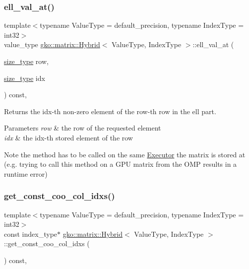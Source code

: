 \subsubsection{\texorpdfstring{ell\+\_\+val\+\_\+at()}{ell\_val\_at()}\hspace{0.1cm}{\footnotesize\ttfamily [2/2]}}
{\footnotesize\ttfamily template$<$typename Value\+Type = default\+\_\+precision, typename Index\+Type = int32$>$ \\
value\+\_\+type \hyperlink{classgko_1_1matrix_1_1Hybrid}{gko\+::matrix\+::\+Hybrid}$<$ Value\+Type, Index\+Type $>$\+::ell\+\_\+val\+\_\+at (\begin{DoxyParamCaption}\item[{\hyperlink{namespacegko_a6e5c95df0ae4e47aab2f604a22d98ee7}{size\+\_\+type}}]{row,  }\item[{\hyperlink{namespacegko_a6e5c95df0ae4e47aab2f604a22d98ee7}{size\+\_\+type}}]{idx }\end{DoxyParamCaption}) const\hspace{0.3cm}{\ttfamily [inline]}, {\ttfamily [noexcept]}}



Returns the {\ttfamily idx}-\/th non-\/zero element of the {\ttfamily row}-\/th row in the ell part. 


\begin{DoxyParams}{Parameters}
{\em row} & the row of the requested element \\
\hline
{\em idx} & the idx-\/th stored element of the row\\
\hline
\end{DoxyParams}
\begin{DoxyNote}{Note}
the method has to be called on the same \hyperlink{classgko_1_1Executor}{Executor} the matrix is stored at (e.\+g. trying to call this method on a G\+PU matrix from the O\+MP results in a runtime error) 
\end{DoxyNote}
\mbox{\label{classgko_1_1matrix_1_1Hybrid_ab637e1576b6449407ee2b57ac203e0f7}} 
\subsubsection{\texorpdfstring{get\+\_\+const\+\_\+coo\+\_\+col\+\_\+idxs()}{get\_const\_coo\_col\_idxs()}}
{\footnotesize\ttfamily template$<$typename Value\+Type = default\+\_\+precision, typename Index\+Type = int32$>$ \\
const index\+\_\+type$\ast$ \hyperlink{classgko_1_1matrix_1_1Hybrid}{gko\+::matrix\+::\+Hybrid}$<$ Value\+Type, Index\+Type $>$\+::get\+\_\+const\+\_\+coo\+\_\+col\+\_\+idxs (\begin{DoxyParamCaption}{ }\end{DoxyParamCaption}) const\hspace{0.3cm}{\ttfamily [inline]}, {\ttfamily [noexcept]}}



